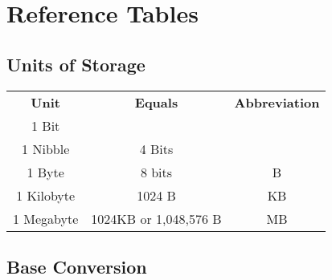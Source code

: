 \chapter{Reference Tables}\label{ch:referencetables}

\section{Units of Storage}\label{s:unitsofstorage}

\begin{center}
	\begin{tabular}{|c|c|c|}
		\hline
		\textbf{Unit} & \textbf{Equals} & \textbf{Abbreviation} \\ \hhline{|=|=|=|}
		1 Bit & & \\ \hline
		1 Nibble & 4 Bits & \\ \hline
		1 Byte & 8 bits & B  \\ \hline
		1 Kilobyte & 1024 B & KB \\ \hline
		1 Megabyte & 1024KB or 1,048,576 B & MB \\ \hline
	\end{tabular}
\end{center}

\clearpage

\section{Base Conversion}\label{s:baseconversion}

\small

